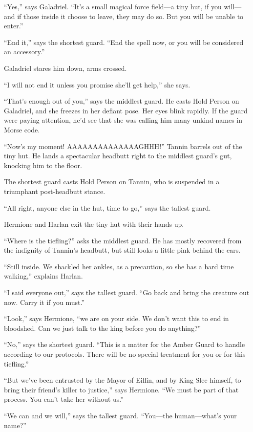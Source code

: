 \documentclass[smalldemyvopaper,11pt,twoside,onecolumn,openright,extrafontsizes]{memoir}
\begin{document}
``Yes,'' says Galadriel. ``It's a small magical force field---a tiny
hut, if you will---and if those inside it choose to leave, they may do
so. But you will be unable to enter.''

``End it,'' says the shortest guard. ``End the spell now, or you will be
considered an accessory.''

Galadriel stares him down, arms crossed.

``I will not end it unless you promise she'll get help,'' she says.

``That's enough out of you,'' says the middlest guard. He casts Hold
Person on Galadriel, and she freezes in her defiant pose. Her eyes blink
rapidly. If the guard were paying attention, he'd see that she was
calling him many unkind names in Morse code.

``Now's my moment! AAAAAAAAAAAAAAGHHH!'' Tannin barrels out of the tiny
hut. He lands a spectacular headbutt right to the middlest guard's gut,
knocking him to the floor.

The shortest guard casts Hold Person on Tannin, who is suspended in a
triumphant post-headbutt stance.

``All right, anyone else in the hut, time to go,'' says the tallest
guard.

Hermione and Harlan exit the tiny hut with their hands up.

``Where is the tiefling?'' asks the middlest guard. He has mostly
recovered from the indignity of Tannin's headbutt, but still looks a
little pink behind the ears.

``Still inside. We shackled her ankles, as a precaution, so she has a
hard time walking,'' explains Harlan.

``I said everyone out,'' says the tallest guard. ``Go back and bring the
creature out now. Carry it if you must.''

``Look,'' says Hermione, ``we are on your side. We don't want this to
end in bloodshed. Can we just talk to the king before you do anything?''

``No,'' says the shortest guard. ``This is a matter for the Amber Guard
to handle according to our protocols. There will be no special treatment
for you or for this tiefling.''

``But we've been entrusted by the Mayor of Eillin, and by King Slee
himself, to bring their friend's killer to justice,'' says Hermione.
``We must be part of that process. You can't take her without us.''

``We can and we will,'' says the tallest guard. ``You---the
human---what's your name?''
\end{document}
